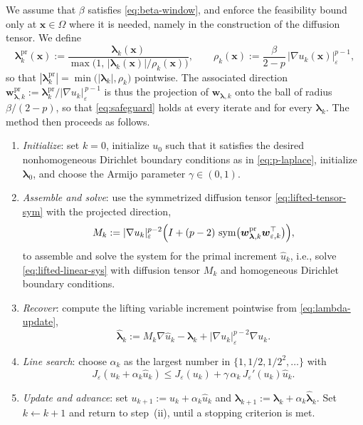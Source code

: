 \documentclass[11pt,pdflatex,sn-mathphys-num]{sn-jnl}
\theoremstyle{thmstyleone}%
\theoremstyle{thmstyletwo}%
\theoremstyle{thmstylethree}%
\newcommand{\bs}[1]{\ensuremath{\boldsymbol{#1}}}
\DeclareMathOperator{\sym}{sym}
\begin{document}
We assume that $\beta$ satisfies \eqref{eq:beta-window}, and enforce the feasibility bound only at $\bs x\in\Omega$ where it is needed, namely in the construction of the diffusion tensor. We define
\begin{equation}\label{eq:discrete-lambda-projection}
  \bs\lambda_k^{\mathrm{pr}}(\bs x):=\frac{\bs\lambda_k(\bs x)}{\max\bigl(1,\,|\bs\lambda_k(\bs x)|/\rho_k(\bs x)\bigr)},
  \qquad \rho_k(\bs x):=\frac{\beta}{2-p}\,|\nabla u_k(\bs x)|_\varepsilon^{p-1},
\end{equation}
so that $|\bs\lambda_k^{\mathrm{pr}}|=\min\bigl(|\bs\lambda_k|,\rho_k\bigr)$ pointwise.
The associated direction $\bs w_{\bs\lambda,k}^{\mathrm{pr}}:=\bs\lambda_k^{\mathrm{pr}}/|\nabla u_k|_\varepsilon^{\,p-1}$ is thus the projection of $\bs w_{\bs\lambda,k}$ onto the ball of radius $\beta/(2-p)$, so that \eqref{eq:safeguard} holds at every iterate and for every $\bs\lambda_k$.
The method then proceeds as follows.
\begin{enumerate}[leftmargin=*,label=(\roman*)]
\item \emph{Initialize}: set $k=0$, initialize $u_0$ such that it satisfies the desired nonhomogeneous Dirichlet boundary conditions as in \eqref{eq:p-laplace}, initialize $\bs\lambda_0$, and choose the Armijo parameter $\gamma\in(0,1)$.
\item \emph{Assemble and solve}: use the symmetrized diffusion tensor \eqref{eq:lifted-tensor-sym} with the projected direction,
\begin{equation}\label{eq:Mk}
  M_k:=|\nabla u_k|_\varepsilon^{p-2}\Bigl(I+(p-2)\,\sym\bigl(\bs w_{\bs\lambda,k}^{\mathrm{pr}}\bs w_{\varepsilon,k}^\top\bigr)\Bigr),
\end{equation}
to assemble and solve the system for the primal increment $\hat u_k$, i.e., solve \eqref{eq:lifted-linear-sys} with diffusion tensor $M_k$ and homogeneous Dirichlet boundary conditions.
\item \emph{Recover}: compute the lifting variable increment pointwise from \eqref{eq:lambda-update},
\begin{equation}\label{eq:lambda-hat}
  \hat{\bs\lambda}_k:=M_k\nabla\hat u_k-\bs\lambda_k+|\nabla u_k|_\varepsilon^{p-2}\nabla u_k.
\end{equation}
\item \emph{Line search}: choose
$\alpha_k$ as the largest number in $\{1,1/2,1/2^2,\ldots\}$ with
\begin{equation}\label{eq:armijo}
  J_\varepsilon(u_k+\alpha_k\hat u_k)\le J_\varepsilon(u_k)+\gamma\,\alpha_k\,J_\varepsilon'(u_k)\hat u_k.
\end{equation}
\item \emph{Update and advance}: set $u_{k+1}:=u_k+\alpha_k\hat u_k$ and $\bs\lambda_{k+1}:=\bs\lambda_k+\alpha_k\hat{\bs\lambda}_k$. Set $k\leftarrow k+1$ and return to step~(ii), until a stopping criterion is met.
\end{enumerate}
\end{document}

